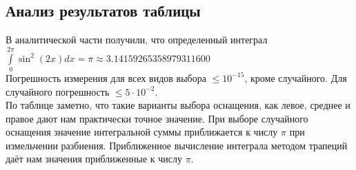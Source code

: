 \documentclass{article}
\begin{document}
\subsection*{Анализ результатов таблицы}
В аналитической части получили, что определенный интеграл
$\int\limits_0^{2\pi} \sin^2(2x) dx  = \pi \approx 3.14159265358979311600$\\
Погрешность измерения для всех видов выбора $\leq 10^{-15}$, кроме случайного. Для случайного погрешность $\leq 5\cdot10^{-2}$. \\
По таблице заметно, что такие варианты выбора оснащения, как левое, среднее и правое дают нам практически точное значение. При выборе случайного оснащения значение интегральной суммы приближается к числу $\pi$ при измельчении разбиения.
Приближенное вычисление интеграла методом трапеций даёт нам значения приближенные к числу $\pi$.
\end{document}
